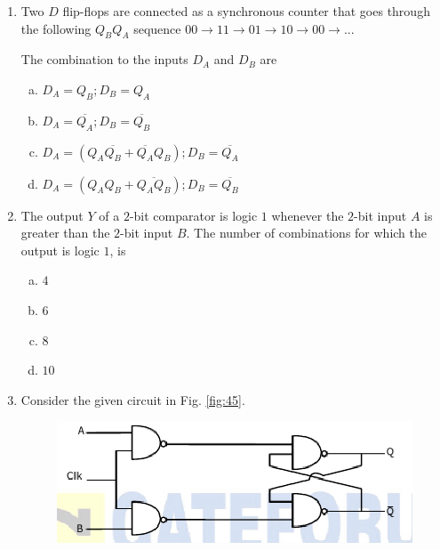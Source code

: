 \documentclass[journal,12pt,twocolumn]{IEEEtran}
\begin{document}
\begin{enumerate}
\begin{figure}
\label{fig:44}

\end{figure} 



\item Two $D$ flip-flops are connected as a synchronous counter that goes through the following $Q_BQ_A$ sequence $ 00 \rightarrow 11 \rightarrow 01 \rightarrow 10 \rightarrow 00 \rightarrow ... $




The combination to the inputs $D_A$ and $D_B$ are

\begin{enumerate}[(a)]

\item $ D_A = Q_B ; D_B = Q_A $

\item $ D_A = \overline{Q_A} ; D_B = \overline{Q_B} $

\item $ D_A = (Q_A \overline{Q_B} + \overline{Q_A}Q_B) ; D_B = \overline{Q_A}$ 

\item $ D_A = (Q_A Q_B + \overline{Q_A Q_B}) ; D_B = \overline{Q_B}$

\end{enumerate}

\item The output $Y$ of a $2$-bit comparator is logic $1$ whenever the $2$-bit input $A$ is greater than the $2$-bit input $B$. The number of combinations for which the output is logic $1$, is 

\begin{enumerate}[(a)]

\item $ 4 $

\item $ 6 $

\item $ 8 $

\item $ 10 $

\end{enumerate}

\item Consider the given circuit in Fig.  \ref{fig:45}.

\begin{figure}

\centering

\includegraphics[width=\columnwidth]{./figs/51.eps}


\end{figure}
\end{enumerate}
\end{document}
